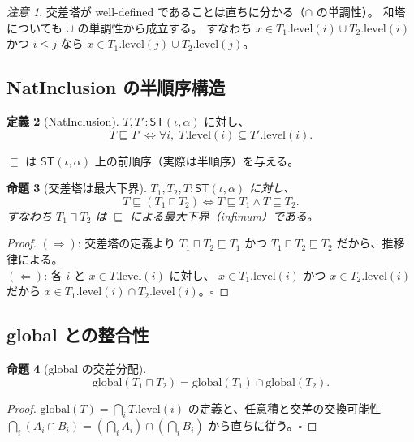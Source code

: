 \documentclass[a4paper,11pt]{ltjsarticle}
\theoremstyle{definition}
\newtheorem{definition}{定義}[section]
\theoremstyle{plain}
\newtheorem{proposition}[definition]{命題}
\theoremstyle{remark}
\newtheorem{remark}[definition]{注意}
\newcommand{\ST}{\mathsf{ST}}
\newcommand{\NatInc}{\sqsubseteq}
\newcommand{\towerMeet}{\sqcap}
\newcommand{\glob}{\mathrm{global}}
\begin{document}
\begin{remark}
交差塔が well-defined であることは直ちに分かる（$\cap$ の単調性）。
和塔についても $\cup$ の単調性から成立する。
すなわち $x \in T_1.\mathrm{level}(i) \cup T_2.\mathrm{level}(i)$ かつ $i \leq j$ なら
$x \in T_1.\mathrm{level}(j) \cup T_2.\mathrm{level}(j)$。
\end{remark}

\subsection{NatInclusion の半順序構造}

\begin{definition}[NatInclusion]
$T, T' : \ST(\iota, \alpha)$ に対し、
\[
T \NatInc T' \iff \forall i,\; T.\mathrm{level}(i) \subseteq T'.\mathrm{level}(i).
\]
\end{definition}

$\NatInc$ は $\ST(\iota, \alpha)$ 上の前順序（実際は半順序）を与える。

\begin{proposition}[交差塔は最大下界]
$T_1, T_2, T : \ST(\iota, \alpha)$ に対し、
\[
T \NatInc (T_1 \towerMeet T_2) \iff T \NatInc T_1 \wedge T \NatInc T_2.
\]
すなわち $T_1 \towerMeet T_2$ は $\NatInc$ による最大下界（infimum）である。
\end{proposition}

\begin{proof}
$(\Rightarrow)$: 交差塔の定義より $T_1 \towerMeet T_2 \NatInc T_1$ かつ
$T_1 \towerMeet T_2 \NatInc T_2$ だから、推移律による。\\
$(\Leftarrow)$: 各 $i$ と $x \in T.\mathrm{level}(i)$ に対し、
$x \in T_1.\mathrm{level}(i)$ かつ $x \in T_2.\mathrm{level}(i)$ だから
$x \in T_1.\mathrm{level}(i) \cap T_2.\mathrm{level}(i)$。\hfill$\square$
\end{proof}

\subsection{global との整合性}

\begin{proposition}[global の交差分配]
\[
\glob(T_1 \towerMeet T_2) = \glob(T_1) \cap \glob(T_2).
\]
\end{proposition}

\begin{proof}
$\glob(T) = \bigcap_i T.\mathrm{level}(i)$ の定義と、任意積と交差の交換可能性
$\bigcap_i (A_i \cap B_i) = (\bigcap_i A_i) \cap (\bigcap_i B_i)$
から直ちに従う。\hfill$\square$
\end{proof}
\end{document}
